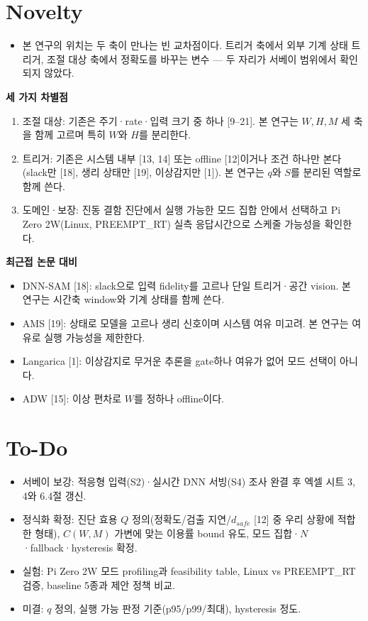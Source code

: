 \documentclass[10pt]{article}
\begin{document}
\section{Novelty}
\begin{itemize}
\item 본 연구의 위치는 두 축이 만나는 빈 교차점이다. 트리거 축에서 외부 기계 상태 트리거, 조절 대상 축에서 정확도를 바꾸는 변수 --- 두 자리가 서베이 범위에서 확인되지 않았다.
\end{itemize}
\noindent\textbf{세 가지 차별점}
\begin{enumerate}
\item 조절 대상: 기존은 주기·rate·입력 크기 중 하나 [9--21]. 본 연구는 $W,H,M$ 세 축을 함께 고르며 특히 $W$와 $H$를 분리한다.
\item 트리거: 기존은 시스템 내부 [13, 14] 또는 offline [12]이거나 조건 하나만 본다(slack만 [18], 생리 상태만 [19], 이상감지만 [1]). 본 연구는 $q$와 $S$를 분리된 역할로 함께 쓴다.
\item 도메인·보장: 진동 결함 진단에서 실행 가능한 모드 집합 안에서 선택하고 Pi Zero 2W(Linux, PREEMPT\_RT) 실측 응답시간으로 스케줄 가능성을 확인한다.
\end{enumerate}
\noindent\textbf{최근접 논문 대비}
\begin{itemize}
\item DNN-SAM [18]: slack으로 입력 fidelity를 고르나 단일 트리거·공간 vision. 본 연구는 시간축 window와 기계 상태를 함께 쓴다.
\item AMS [19]: 상태로 모델을 고르나 생리 신호이며 시스템 여유 미고려. 본 연구는 여유로 실행 가능성을 제한한다.
\item Langarica [1]: 이상감지로 무거운 추론을 gate하나 여유가 없어 모드 선택이 아니다.
\item ADW [15]: 이상 편차로 $W$를 정하나 offline이다.
\end{itemize}

\section{To-Do}
\begin{itemize}
\item 서베이 보강: 적응형 입력(S2)·실시간 DNN 서빙(S4) 조사 완결 후 엑셀 시트 3, 4와 6.4절 갱신.
\item 정식화 확정: 진단 효용 $Q$ 정의(정확도/검출 지연/$d_{safe}$ [12] 중 우리 상황에 적합한 형태), $C(W,M)$ 가변에 맞는 이용률 bound 유도, 모드 집합·$N$·fallback·hysteresis 확정.
\item 실험: Pi Zero 2W 모드 profiling과 feasibility table, Linux vs PREEMPT\_RT 검증, baseline 5종과 제안 정책 비교.
\item 미결: $q$ 정의, 실행 가능 판정 기준(p95/p99/최대), hysteresis 정도.
\end{itemize}
\end{document}
